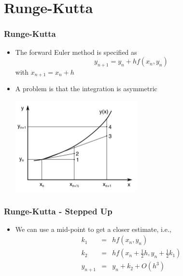 \documentclass[10pt]{beamer}
\begin{document}
\section{Runge-Kutta}

\begin{frame}
  \frametitle{Runge-Kutta}
  \begin{itemize}
  \item The forward Euler method is specified as
    \[
      y_{n+1} = y_n + h f( x_n, y_n )
    \]
    with $x_{n+1} = x_n + h$ 
  \item A problem is that the integration is asymmetric
    \centerline{\includegraphics[height=5cm]{12}}
  \end{itemize}
\end{frame}

\begin{frame}
  \frametitle{Runge-Kutta - Stepped Up}
  \begin{itemize}
  \item We can use a mid-point to get a closer estimate, i.e.,
    \[
      \begin{array}{rcl}
        k_1 & = & h f(x_n, y_n)\\
        k_2 & = & h f( x_n + \frac{1}{2} h, y_n + \frac{1}{2} k_1)\\
        y_{n+1} & = & y_n + k_2 + O(h^3)\\
      \end{array}
    \]
  \end{itemize}
\end{frame}
\end{document}
